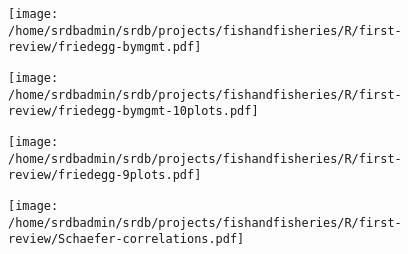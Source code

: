 
\begin{figure}
\begin{center}
\texttt{[image: /home/srdbadmin/srdb/projects/fishandfisheries/R/first-review/friedegg-bymgmt.pdf]}
\end{center}
\caption{ }\label{fig:friedegg}
\end{figure}

\begin{figure}
\begin{center}
\texttt{[image: /home/srdbadmin/srdb/projects/fishandfisheries/R/first-review/friedegg-bymgmt-10plots.pdf]}
\end{center}
\caption{ }
\end{figure}

\begin{figure}
\begin{center}
\texttt{[image: /home/srdbadmin/srdb/projects/fishandfisheries/R/first-review/friedegg-9plots.pdf]}
\end{center}
\caption{ }
\end{figure}


\begin{figure}
\begin{center}
\texttt{[image: /home/srdbadmin/srdb/projects/fishandfisheries/R/first-review/Schaefer-correlations.pdf]}
\end{center}
\caption{ }\label{fig:S1}
\end{figure}

